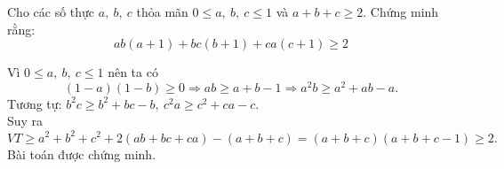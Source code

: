 \begin{ex}%
    Cho các số thực $a,\ b,\ c$ thỏa mãn $0\le a,\ b,\ c\le 1$ và $a+b+c\ge 2$. Chứng minh rằng:
$$ab(a+1)+bc(b+1)+ca(c+1)\ge 2$$
\loigiai
    { Vì $0 \leq a,\ b,\ c \leq 1$ nên ta có $$(1-a)(1-b) \geq 0 \Rightarrow ab \geq a+b-1 \Rightarrow a^2b \geq a^2+ab-a.$$
    Tương tự: $b^2c \geq b^2+bc-b,\ c^2a \geq c^2+ca-c$.\\
    Suy ra $$VT \geq a^2+b^2+c^2+2(ab+bc+ca)-(a+b+c)=(a+b+c)(a+b+c-1) \geq 2.$$
    Bài toán được chứng minh. 
    
    }
\end{ex}

